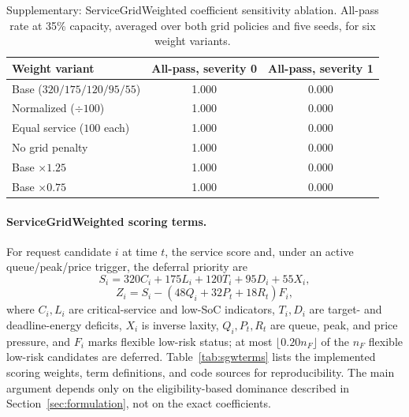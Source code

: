 \documentclass[12pt]{article}
\begin{document}
\begin{table}[H]
\centering
\caption{Supplementary: ServiceGridWeighted coefficient sensitivity ablation. All-pass rate at 35\% capacity, averaged over both grid policies and five seeds, for six weight variants.}
\label{tab:sgwablation}
\begin{tabular}{lcc}
\hline
Weight variant & All-pass, severity 0 & All-pass, severity 1 \\
\hline
Base ($320/175/120/95/55$) & 1.000 & 0.000 \\
Normalized ($\div 100$) & 1.000 & 0.000 \\
Equal service ($100$ each) & 1.000 & 0.000 \\
No grid penalty & 1.000 & 0.000 \\
Base $\times 1.25$ & 1.000 & 0.000 \\
Base $\times 0.75$ & 1.000 & 0.000 \\
\hline
\end{tabular}
\end{table}

\paragraph{ServiceGridWeighted scoring terms.} For request candidate $i$ at time $t$, the service score and, under an active queue/peak/price trigger, the deferral priority are
\begin{equation}
S_i = 320C_i + 175L_i + 120T_i + 95D_i + 55X_i,
\label{eq:sgwservice}
\end{equation}
\begin{equation}
Z_i = S_i - (48Q_i + 32P_t + 18R_t)F_i,
\label{eq:sgwpriority}
\end{equation}
where $C_i,L_i$ are critical-service and low-SoC indicators, $T_i,D_i$ are target- and deadline-energy deficits, $X_i$ is inverse laxity, $Q_i,P_t,R_t$ are queue, peak, and price pressure, and $F_i$ marks flexible low-risk status; at most $\lfloor 0.20 n_F \rfloor$ of the $n_F$ flexible low-risk candidates are deferred. Table~\ref{tab:sgwterms} lists the implemented scoring weights, term definitions, and code sources for reproducibility. The main argument depends only on the eligibility-based dominance described in Section~\ref{sec:formulation}, not on the exact coefficients.
\end{document}
